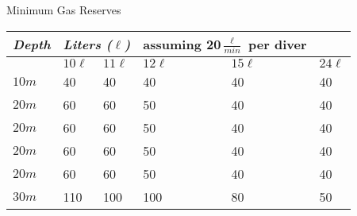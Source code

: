 \documentclass{slides}
\begin{document}
\begin{slide}
\thispagestyle{empty}

\begin{center}
  \LARGE
  Minimum Gas Reserves
\end{center}

\LARGE
\begin{tabularx}{\textwidth}{X|XXXXX}
  \toprule
  \emph{Depth}  & \multicolumn{2}{l}{\emph{Liters ($\ell$)}} & \multicolumn{2}{l}{\small{assuming 20$\frac{\ell}{min}$ per diver}}   \\ \midrule
                & $10\ell$   & $11\ell$   & $12\ell$   & $15\ell$   & $24\ell$ \\
  \rowcolor{gray!10}
  $10m$           & 40    & 40    & 40    & 40    & 40  \\
  $20m$           & 60    & 60    & 50    & 40    & 40  \\
  \rowcolor{gray!10}
  $20m$           & 60    & 60    & 50    & 40    & 40  \\
  $20m$           & 60    & 60    & 50    & 40    & 40  \\
  \rowcolor{gray!10}
  $20m$           & 60    & 60    & 50    & 40    & 40  \\
  $30m$           & 110   & 100   & 100   & 80    & 50  \\ \bottomrule
  \hline
\end{tabularx}

\end{slide}
\end{document}
